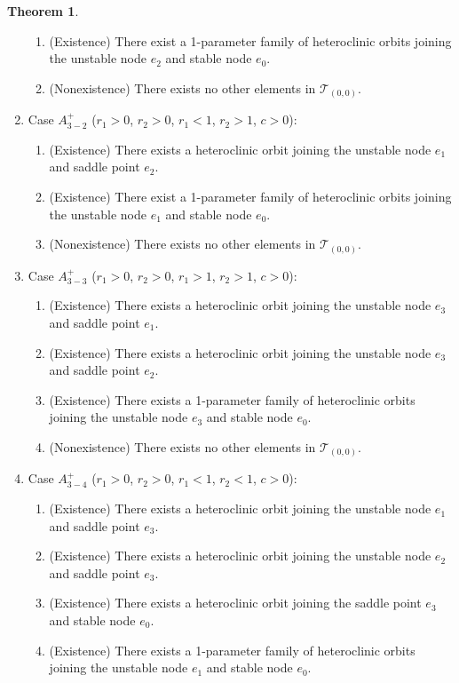 \documentclass{amsart}
\theoremstyle{definition}
\newtheorem{theorem}{Theorem}
\numberwithin{equation}{section}
\begin{document}
\begin{theorem}
\begin{enumerate}
\begin{enumerate}
   \item (Existence) There exist a 1-parameter family of heteroclinic orbits joining the unstable node  $e_2$ and stable node $e_0$.
  \item (Nonexistence) There exists no other elements in $\mathcal{T}_{(0,0)}$.
 \end{enumerate}
 \item Case $A_{3-2}^+$ ($r_1>0$, $r_2>0$, $r_1 <1$, $r_2>1$, $c>0$):
 \begin{enumerate}
   \item (Existence) There exists a heteroclinic orbit joining the unstable node $e_1$ and saddle point $e_2$.
   \item (Existence) There exist a 1-parameter family of heteroclinic orbits joining the unstable node  $e_1$ and stable node $e_0$.
  \item (Nonexistence) There exists no other elements in $\mathcal{T}_{(0,0)}$.
 \end{enumerate} 
 \item Case $A_{3-3}^+$ ($r_1>0$, $r_2>0$, $r_1>1$, $r_2>1$, $c>0$):
 \begin{enumerate}
 \item (Existence) There exists a heteroclinic orbit joining the unstable node $e_3$ and saddle point $e_1$.
 \item (Existence) There exists a heteroclinic orbit joining the unstable node $e_3$ and saddle point $e_2$.
 \item (Existence) There exists a 1-parameter family of heteroclinic orbits joining the unstable node $e_3$ and stable node $e_0$.
 \item (Nonexistence) There exists no other elements in $\mathcal{T}_{(0,0)}$.
 \end{enumerate}
 \item Case $A_{3-4}^+$ ($r_1>0$, $r_2>0$, $r_1<1$, $r_2<1$, $c>0$):
 \begin{enumerate}
 \item (Existence) There exists a heteroclinic orbit joining the unstable node $e_1$ and saddle point $e_3$.
 \item (Existence) There exists a heteroclinic orbit joining the unstable node $e_2$ and saddle point $e_3$.
 \item (Existence) There exists a heteroclinic orbit joining the saddle point $e_3$ and stable node $e_0$.
 \item (Existence) There exists a 1-parameter family of heteroclinic orbits joining the unstable node $e_1$ and stable node $e_0$.

\end{enumerate}
\end{enumerate}
\end{theorem}
\end{document}
